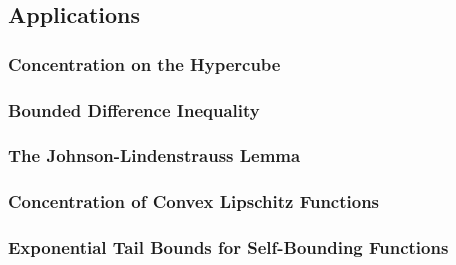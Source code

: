 \documentclass[11pt]{article}
\begin{document}
\subsection{Applications}
\subsubsection{Concentration on the Hypercube}
\subsubsection{Bounded Difference Inequality}
\subsubsection{The Johnson-Lindenstrauss Lemma}
\subsubsection{Concentration of Convex Lipschitz Functions}
\subsubsection{Exponential Tail Bounds for Self-Bounding Functions}


\newpage


\end{document}
